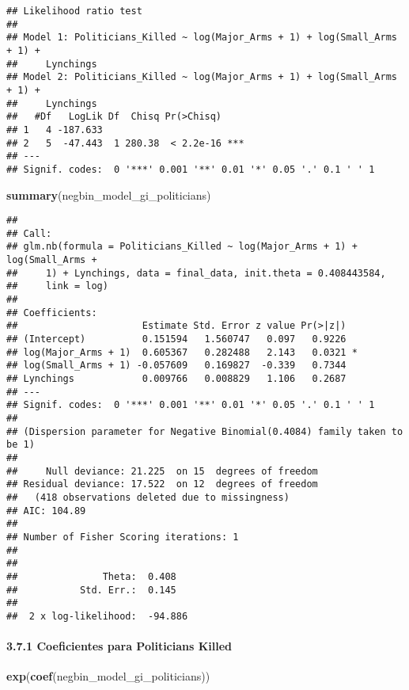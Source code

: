 \documentclass[
  11pt,
]{article}
\newenvironment{Shaded}{\begin{snugshade}}{\end{snugshade}}
\newcommand{\FunctionTok}[1]{\textcolor[rgb]{0.13,0.29,0.53}{\textbf{#1}}}
\newcommand{\NormalTok}[1]{#1}
\begin{document}
\begin{verbatim}
## Likelihood ratio test
## 
## Model 1: Politicians_Killed ~ log(Major_Arms + 1) + log(Small_Arms + 1) + 
##     Lynchings
## Model 2: Politicians_Killed ~ log(Major_Arms + 1) + log(Small_Arms + 1) + 
##     Lynchings
##   #Df   LogLik Df  Chisq Pr(>Chisq)    
## 1   4 -187.633                         
## 2   5  -47.443  1 280.38  < 2.2e-16 ***
## ---
## Signif. codes:  0 '***' 0.001 '**' 0.01 '*' 0.05 '.' 0.1 ' ' 1
\end{verbatim}

\begin{Shaded}
\begin{Highlighting}[]
\FunctionTok{summary}\NormalTok{(negbin\_model\_gi\_politicians)}
\end{Highlighting}
\end{Shaded}

\begin{verbatim}
## 
## Call:
## glm.nb(formula = Politicians_Killed ~ log(Major_Arms + 1) + log(Small_Arms + 
##     1) + Lynchings, data = final_data, init.theta = 0.408443584, 
##     link = log)
## 
## Coefficients:
##                      Estimate Std. Error z value Pr(>|z|)  
## (Intercept)          0.151594   1.560747   0.097   0.9226  
## log(Major_Arms + 1)  0.605367   0.282488   2.143   0.0321 *
## log(Small_Arms + 1) -0.057609   0.169827  -0.339   0.7344  
## Lynchings            0.009766   0.008829   1.106   0.2687  
## ---
## Signif. codes:  0 '***' 0.001 '**' 0.01 '*' 0.05 '.' 0.1 ' ' 1
## 
## (Dispersion parameter for Negative Binomial(0.4084) family taken to be 1)
## 
##     Null deviance: 21.225  on 15  degrees of freedom
## Residual deviance: 17.522  on 12  degrees of freedom
##   (418 observations deleted due to missingness)
## AIC: 104.89
## 
## Number of Fisher Scoring iterations: 1
## 
## 
##               Theta:  0.408 
##           Std. Err.:  0.145 
## 
##  2 x log-likelihood:  -94.886
\end{verbatim}

\paragraph{3.7.1 Coeficientes para Politicians
Killed}\label{coeficientes-para-politicians-killed}

\begin{Shaded}
\begin{Highlighting}[]
\FunctionTok{exp}\NormalTok{(}\FunctionTok{coef}\NormalTok{(negbin\_model\_gi\_politicians))}
\end{Highlighting}
\end{Shaded}
\end{document}

